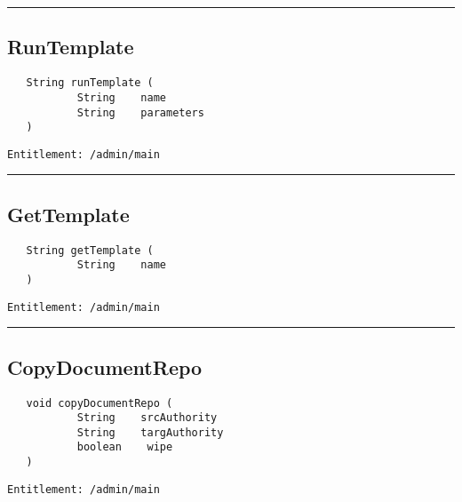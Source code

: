 \rule{12cm}{2pt}
\subsection{RunTemplate}
\label{Api:RunTemplate}
\begin{verbatim}
   String runTemplate (
           String    name
           String    parameters
   )
\end{verbatim}
\begin{Verbatim}[fontsize=\small, formatcom=\color{Maroon}]
  Entitlement: /admin/main
\end{Verbatim}



\rule{12cm}{2pt}
\subsection{GetTemplate}
\label{Api:GetTemplate}
\begin{verbatim}
   String getTemplate (
           String    name
   )
\end{verbatim}
\begin{Verbatim}[fontsize=\small, formatcom=\color{Maroon}]
  Entitlement: /admin/main
\end{Verbatim}



\rule{12cm}{2pt}
\subsection{CopyDocumentRepo}
\label{Api:CopyDocumentRepo}
\begin{verbatim}
   void copyDocumentRepo (
           String    srcAuthority
           String    targAuthority
           boolean    wipe
   )
\end{verbatim}
\begin{Verbatim}[fontsize=\small, formatcom=\color{Maroon}]
  Entitlement: /admin/main
\end{Verbatim}



